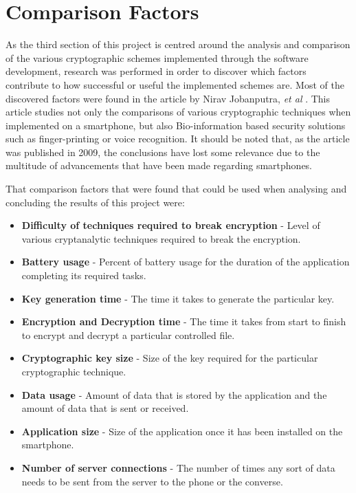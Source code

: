 \documentclass[a4paper,12pt]{report}
\begin{document}
\section{Comparison Factors}

As the third section of this project is centred around the analysis and comparison of the various cryptographic schemes implemented through the software development, research was performed in order to discover which factors contribute to how successful or useful the implemented schemes are. Most of the discovered factors were found in the article by Nirav Jobanputra, \textit{et al} \cite{ejeta}. This article studies not only the comparisons of various cryptographic techniques when implemented on a smartphone, but also Bio-information based security solutions such as finger-printing or voice recognition. It should be noted that, as the article was published in 2009, the conclusions have lost some relevance due to the multitude of advancements that have been made regarding smartphones. 

That comparison factors that were found that could be used when analysing and concluding the results of this project were:

\begin{itemize}
 \item \textbf{Difficulty of techniques required to break encryption} - Level of various cryptanalytic techniques required to break the encryption. 
 \item \textbf{Battery usage} - Percent of battery usage for the duration of the application completing its required tasks. 
 \item \textbf{Key generation time} - The time it takes to generate the particular key.
 \item \textbf{Encryption and Decryption time} - The time it takes from start to finish to encrypt and decrypt a particular controlled file. 
 \item \textbf{Cryptographic key size} - Size of the key required for the particular cryptographic technique. 
 \item \textbf{Data usage} - Amount of data that is stored by the application and the amount of data that is sent or received. 
 \item \textbf{Application size} - Size of the application once it has been installed on the smartphone. 
 \item \textbf{Number of server connections} - The number of times any sort of data needs to be sent from the server to the phone or the converse.   
\end{itemize}
\end{document}
